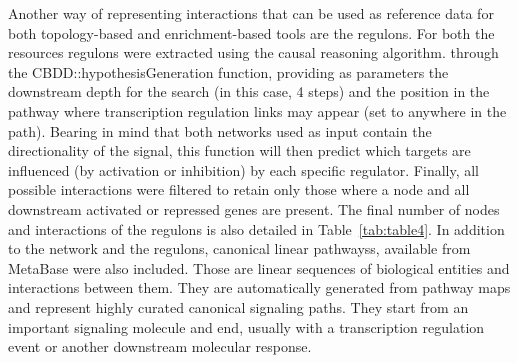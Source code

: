 Another way of representing interactions that can be used as reference data for both topology-based and enrichment-based tools are the regulons. For both the resources regulons were extracted using the causal reasoning algorithm. through the \gls{CBDD}::hypothesisGeneration function, providing as parameters the downstream depth for the search (in this case, 4 steps) and the position in the pathway where transcription regulation links may appear (set to anywhere in the path). 
Bearing in mind that both networks used as input contain the directionality of the signal, this function will then predict which targets are influenced (by activation or inhibition) by each specific regulator. 
Finally, all possible interactions were filtered to retain only those where a node and all downstream activated or repressed genes are present. The final number of nodes and interactions of the regulons is also detailed in Table~\ref{tab:table4}. 
In addition to the network and the regulons, canonical linear pathwayss, available from MetaBase were also included. Those are linear sequences of biological entities and interactions between them. They are automatically generated from pathway maps and represent highly curated canonical signaling paths. 
They start from an important signaling molecule and end, usually with a transcription regulation event or another downstream molecular response.

